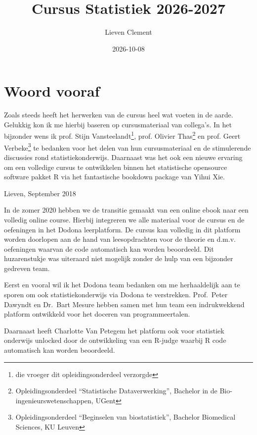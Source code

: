 \documentclass[
  dutch,
  letterpaper,
  12pt]{book}
\title{Cursus Statistiek 2026-2027}
\author{Lieven Clement}
\date{2026-10-08}
\renewcommand*\contentsname{Inhoudsopgave}
\newcommand\contentsname{Inhoudsopgave}
\theoremstyle{definition}
\theoremstyle{definition}
\theoremstyle{definition}
\theoremstyle{remark}
\begin{document}
\frontmatter
\maketitle

\renewcommand*\contentsname{Inhoudsopgave}
{
\setcounter{tocdepth}{2}
\tableofcontents
}

\mainmatter
{}

\chapter*{Woord vooraf}\label{woord-vooraf}


Zoals steeds heeft het herwerken van de cursus heel wat voeten in de
aarde. Gelukkig kon ik me hierbij baseren op cursusmateriaal van
collega's. In het bijzonder wens ik prof. Stijn Vansteelandt\footnote{die
  vroeger dit opleidingsonderdeel verzorgde}, prof. Olivier
Thas\footnote{Opleidingsonderdeel ``Statistische Dataverwerking'',
  Bachelor in de Bio-ingenieurswetenschappen, UGent} en prof. Geert
Verbeke\footnote{Opleidingsonderdeel ``Beginselen van biostatistiek'',
  Bachelor Biomedical Sciences, KU Leuven} te bedanken voor het delen
van hun cursusmateriaal en de stimulerende discussies rond
statistiekonderwijs. Daarnaast was het ook een nieuwe ervaring om een
volledige cursus te ontwikkelen binnen het statistische opensource
software pakket R via het fantastische bookdown package van Yihui Xie.

Lieven, September 2018

In de zomer 2020 hebben we de transitie gemaakt van een online ebook
naar een volledig online course. Hierbij integreren we alle materiaal
voor de cursus en de oefeningen in het Dodona leerplatform. De cursus
kan volledig in dit platform worden doorlopen aan de hand van
leesopdrachten voor de theorie en d.m.v. oefeningen waarvan de code
automatisch kan worden beoordeeld. Dit huzarenstukje was uiteraard niet
mogelijk zonder de hulp van een bijzonder gedreven team.

Eerst en vooral wil ik het Dodona team bedanken om me herhaaldelijk aan
te sporen om ook statistiekonderwijs via Dodona te verstrekken.
Prof.~Peter Dawyndt en Dr.~Bart Mesure hebben samen met hun team een
indrukwekkend platform ontwikkeld voor het doceren van programmeertalen.

Daarnaast heeft Charlotte Van Petegem het platform ook voor statistiek
onderwijs unlocked door de ontwikkeling van een R-judge waarbij R code
automatisch kan worden beoordeeld.
\end{document}
